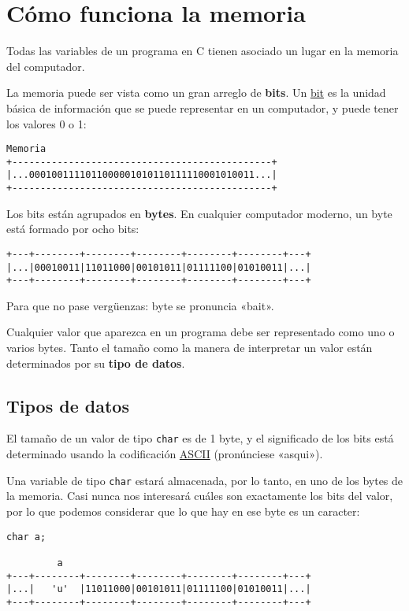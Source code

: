 \section{Cómo funciona la memoria}

Todas las variables de un programa en C tienen asociado un lugar en la
memoria del computador.

La memoria puede ser vista como un gran arreglo de \textbf{bits}. Un
\href{http://en.wikipedia.org/wiki/Bit}{bit} es la unidad básica de
información que se puede representar en un computador, y puede tener los
valores 0 o 1:

\begin{verbatim}
Memoria
+----------------------------------------------+
|...0001001111011000001010110111110001010011...|
+----------------------------------------------+
\end{verbatim}

Los bits están agrupados en \textbf{bytes}. En cualquier computador
moderno, un byte está formado por ocho bits:

\begin{verbatim}
+---+--------+--------+--------+--------+--------+---+
|...|00010011|11011000|00101011|01111100|01010011|...|
+---+--------+--------+--------+--------+--------+---+
\end{verbatim}

Para que no pase vergüenzas: byte se pronuncia «bait».

Cualquier valor que aparezca en un programa debe ser representado como
uno o varios bytes. Tanto el tamaño como la manera de interpretar un
valor están determinados por su \textbf{tipo de datos}.

\subsection{Tipos de datos}

El tamaño de un valor de tipo \lstinline!char! es de 1 byte, y el
significado de los bits está determinado usando la codificación
\href{http://en.wikipedia.org/wiki/ASCII}{ASCII} (pronúnciese «asqui»).

Una variable de tipo \lstinline!char! estará almacenada, por lo tanto,
en uno de los bytes de la memoria. Casi nunca nos interesará cuáles son
exactamente los bits del valor, por lo que podemos considerar que lo que
hay en ese byte es un caracter:

\begin{verbatim}
char a;

         a
+---+--------+--------+--------+--------+--------+---+
|...|   'u'  |11011000|00101011|01111100|01010011|...|
+---+--------+--------+--------+--------+--------+---+
\end{verbatim}


